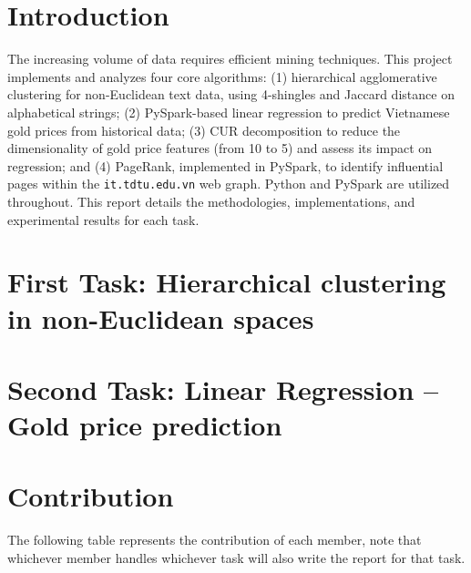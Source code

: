 \documentclass[conference]{IEEEtran}
\begin{document}
    \section{Introduction}
    \label{sec:introduction}
    The increasing volume of data requires efficient mining techniques.
    This project implements and analyzes four core algorithms: (1) hierarchical agglomerative clustering for non-Euclidean text data, using 4-shingles and Jaccard distance on alphabetical strings; (2) PySpark-based linear regression to predict Vietnamese gold prices from historical data; (3) CUR decomposition to reduce the dimensionality of gold price features (from 10 to 5) and assess its impact on regression; and (4) PageRank, implemented in PySpark, to identify influential pages within the \texttt{it.tdtu.edu.vn} web graph.
    Python and PySpark are utilized throughout.
    This report details the methodologies, implementations, and experimental results for each task.


    \section{First Task: Hierarchical clustering in non-Euclidean spaces}
    \label{sec:first-task}
    


    \section{Second Task: Linear Regression – Gold price prediction}
    \label{sec:second-task}
    


    \section{Contribution}
    \label{sec:contribution}

    The following table represents the contribution of each member, note that whichever member handles whichever task will also write the report for that task.
\end{document}
